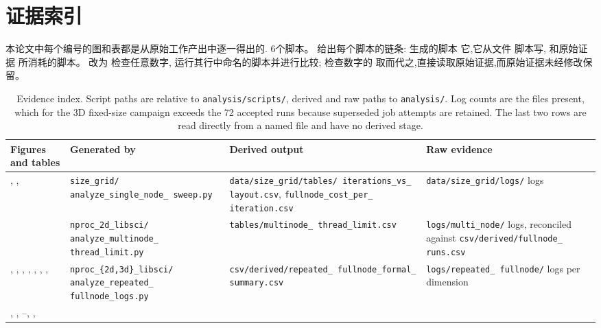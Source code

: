 \documentclass[11pt,a4paper,oneside]{report}
\begin{document}
\section{证据索引}
\label{app:evidence}
本论文中每个编号的图和表都是从原始工作产出中逐一得出的.
6个脚本。 给出每个脚本的链条: 生成的脚本
它,它从文件 脚本写, 和原始证据 所消耗的脚本。 改为
检查任意数字, 运行其行中命名的脚本并进行比较; 检查数字的
取而代之,直接读取原始证据,而原始证据未经修改保留。

\begin{table}[htbp]
  \centering
  \caption{Evidence index. Script paths are relative to
  \texttt{analysis/scripts/}, derived and raw paths to \texttt{analysis/}. Log
  counts are the files present, which for the 3D fixed-size campaign exceeds the 72
  accepted runs because superseded job attempts are retained. The last two rows are read
  directly from a named file and have no derived stage.}
  \label{tab:evidence-index}
  \footnotesize
  \begin{tabular}{L{0.155\textwidth} L{0.215\textwidth} L{0.245\textwidth} L{0.235\textwidth}}
    \toprule
    Figures and tables & Generated by & Derived output & Raw evidence \\
    \midrule
    , , 
      & \texttt{size\_grid/ analyze\_single\_node\_ sweep.py}
      & \texttt{data/size\_grid/tables/ iterations\_vs\_ layout.csv}, \texttt{fullnode\_cost\_per\_ iteration.csv}
      & \texttt{data/size\_grid/logs/}  logs \\
    \addlinespace
      & \texttt{nproc\_2d\_libsci/ analyze\_multinode\_ thread\_limit.py}
      & \texttt{tables/multinode\_ thread\_limit.csv}
      & \texttt{logs/multi\_node/}  logs, reconciled against \texttt{csv/derived/fullnode\_ runs.csv} \\
    \addlinespace
    , , , , , , , 
      & \texttt{nproc\_\{2d,3d\}\_libsci/ analyze\_repeated\_ fullnode\_logs.py}
      & \texttt{csv/derived/repeated\_ fullnode\_formal\_ summary.csv}
      & \texttt{logs/repeated\_ fullnode/}  logs per dimension \\
    \addlinespace
    , , --, , 

\end{tabular}
\end{table}
\end{document}
